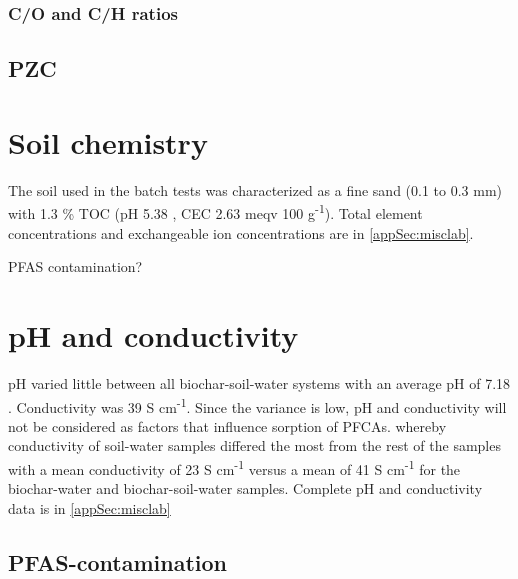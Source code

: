 \subsubsection{C/O and C/H ratios}

\subsection{PZC}


\section{Soil chemistry}
The soil used in the batch tests was characterized as a fine sand (0.1 to 0.3 mm) with 1.3 \% TOC (pH 5.38  , CEC 2.63  meqv 100 g\textsuperscript{-1}). Total element concentrations and exchangeable ion concentrations are in \ref{appSec:misclab}. 

PFAS contamination?

\section{pH and conductivity}
pH varied little between all biochar-soil-water systems with an average pH of 7.18 .
Conductivity was 39  \textmu S cm\textsuperscript{-1}. Since the variance is low, pH and conductivity will not be considered as factors that influence sorption of PFCAs. whereby conductivity of soil-water samples differed the most from the rest of the samples with a mean conductivity of 23  \textmu S cm\textsuperscript{-1} versus a mean of 41  \textmu S cm\textsuperscript{-1} for the biochar-water and biochar-soil-water samples. Complete pH and conductivity data is in \cref{appSec:misclab} 

\subsection{PFAS-contamination}


